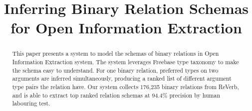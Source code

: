 \documentclass[11pt]{article}
\title{Inferring Binary Relation Schemas for Open Information Extraction}
\date{}
\begin{document}
\maketitle
\begin{abstract}

This paper presents a system to model the schemas of binary relations in Open Information Extraction system.
The system leverages Freebase type taxonomy \cite{bollacker2008freebase} to make the schema easy to understand.
For one binary relation, preferred types on two arguments are inferred simultaneously,
producing a ranked list of different argument type pairs the relation have.
Our system collects 176,235 binary relations from ReVerb, and is able to extract top ranked
relation schemas at 94.4\% precision by human labouring test.


\end{abstract}




















\end{document}
